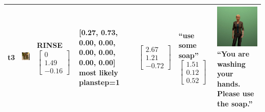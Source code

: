 \begin{longtable}{| V{0.8cm} | V{2.6cm} | V{1.6cm} | V{2.1cm} | V{1.55cm} | V{1.6cm} | V{3.2cm} |}
t3 &
\includegraphics[width=\linewidth]{fig/system/_fast2-rinse1_.jpg} &
RINSE
\linebreak\linebreak
$\begin{bmatrix}
0 \\
1.49 \\
-0.16
\end{bmatrix}$ &
[0.27, 0.73, 0.00, 0.00, 0.00, 0.00, 0.00, 0.00] most likely planstep=1 &
$\begin{bmatrix}
2.67 \\
1.21 \\
-0.72
\end{bmatrix}$ &
``use some soap''
\linebreak\linebreak
$\begin{bmatrix}
1.51 \\
0.12 \\
0.52
\end{bmatrix}$ &
\includegraphics[width=2.6cm]{fig/prompt/_please-use-the-soap_.jpg}
\linebreak
\footnotesize
``You are washing your hands. Please use the soap.''
\\ \hline



\end{longtable}
